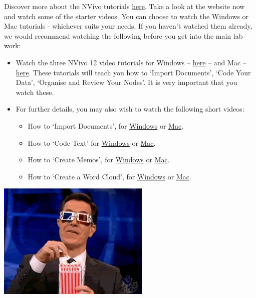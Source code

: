 \documentclass[
]{book}
\providecommand{\tightlist}{%
  \setlength{\itemsep}{0pt}\setlength{\parskip}{0pt}}
\begin{document}
Discover more about the NVivo tutorials \href{https://www.qsrinternational.com/nvivo/free-nvivo-resources/tutorials}{here}. Take a look at the website now and watch some of the starter videos. You can choose to watch the Windows or Mac tutorials - whichever suits your needs. If you haven't watched them already, we would recommend watching the following before you get into the main lab work:

\begin{itemize}
\item
  Watch the three NVivo 12 video tutorials for Windows -- \href{https://www.qsrinternational.com/nvivo/nvivo-12-tutorial-windows/00-let-s-get-started}{here} -- and Mac -- \href{https://www.qsrinternational.com/nvivo/nvivo-12-tutorial-mac/00-let-s-get-started}{here}. These tutorials will teach you how to `Import Documents', `Code Your Data', `Organise and Review Your Nodes'. It is very important that you watch these.
\item
  For further details, you may also wish to watch the following short videos:

  \begin{itemize}
  \tightlist
  \item
    How to `Import Documents', for \href{https://www.youtube.com/watch?v=NjTIYXTsYSE}{Windows} or \href{https://www.youtube.com/watch?v=TmkqvFXKwo4}{Mac}.
  \item
    How to `Code Text' for \href{https://www.youtube.com/watch?v=7v59gwQ2LUY}{Windows} or \href{https://www.youtube.com/watch?v=nxYT0J6lbDU}{Mac}.
  \item
    How to `Create Memos', for \href{https://www.youtube.com/watch?v=Gks-AtrMLlI}{Windows} or \href{https://www.youtube.com/watch?v=_tSQZBZeAUc}{Mac}.
  \item
    How to `Create a Word Cloud', for \href{https://www.youtube.com/watch?v=Rx-8eY_z6lQ}{Windows} or \href{https://www.youtube.com/watch?v=mEVyV19D0fY}{Mac}.
  \end{itemize}
\end{itemize}

\includegraphics{imgs/popcorn.gif}
\end{document}
